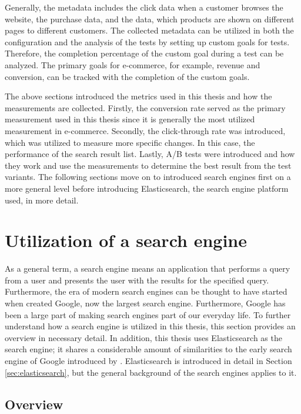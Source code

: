 Generally, the metadata includes the click data when a customer browses the website, the purchase data, 
and the data, which products are shown on different pages to different customers.
The collected metadata can be utilized in both the configuration and the analysis of the tests 
by setting up custom goals for tests. 
Therefore, the completion percentage of the custom goal during a test can be analyzed.
The primary goals for e-commerce, for example, revenue and conversion, 
can be tracked with the completion of the custom goals.
\cite{analyticsAbout}
 

The above sections introduced the metrics used in this thesis and how the measurements are
collected.
Firstly, the conversion rate served as the primary measurement used in this thesis 
since it is generally the most utilized measurement in e-commerce.
Secondly, the click-through rate was introduced, which was utilized to measure more
specific changes.
In this case, the performance of the search result list.
Lastly, A/B tests were introduced and how they work and use the measurements to determine
the best result from the test variants.
The following sections move on to introduced search engines first on a more general level before
introducing Elasticsearch, the search engine platform used, in more detail.


\section{Utilization of a search engine}

As a general term, a search engine means an application that performs a query from a user and 
presents the user with the results for the specified query. 
Furthermore, the era of modern search engines can be thought to have started when
\citeauthor{googleInit} \cite{googleInit} created Google,
now the largest search engine. 
Furthermore, Google has been a large part of making search engines part of our everyday life.
To further understand how a search engine is utilized in this thesis, this section
provides an overview in necessary detail.
In addition, this thesis uses Elasticsearch as the search engine; it shares a considerable amount
of similarities to the early search engine of Google introduced by 
\citeauthor{googleInit} \cite{googleInit}.
Elasticsearch is introduced in detail in Section \ref{sec:elasticsearch}, but the general
background of the search engines applies to it.


\subsection{Overview}

